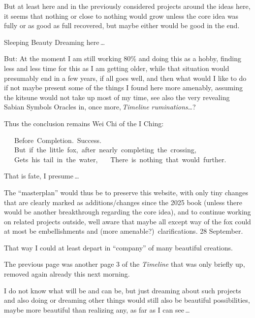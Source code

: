 {\begin{itemize}
But at least here and in the previously considered projects around the ideas here,
it seems that nothing or close to nothing would grow
unless the core idea was fully or as good as full recovered,
but maybe either would be good in the end.

Sleeping Beauty Dreaming here\,…

But: At the moment I am still working 80\% and doing this as a hobby,
finding less and less time for this as I am getting older,
while that situation would presumably end in a few years,
if all goes well,
and then what would I like to do
if not maybe present some of the things I found here more amenably,
assuming the kitsune would not take up most of my time,
see also the very revealing Sabian Symbols Oracles in, once more,\,\textsl{Timeline ruminations}…?

Thus the conclusion remains Wei Chi of the I Ching:

\vspace{1.2mm}
\mbox{\ \ \ Before Completion. Success.}\newline
\mbox{\ \ \ But if the little fox, after nearly completing the crossing,}\newline
\mbox{\ \ \ Gets his tail in the water,}\newline
\mbox{\ \ \ There is nothing that would further.}
\vspace{1.2mm}

That is fate, I presume\,…

The “masterplan” would thus be to preserve this website,
with only tiny changes that are clearly marked as additions/changes since the 2025 book
(unless there would be another breakthrough regarding the core idea),
and to continue working on related projects outside,
well aware that maybe all except way of the fox
could at most be embellishments and (more amenable?)\ clarifications.
%
28 September.

That way I could at least depart in “company” of many beautiful creations.

\end{itemize}
\normalsize

\newpage

\noindent
The previous page was another page 3 of the \textsl{Timeline}
that was only briefly up,
removed again already this next morning.

I do not know what will be and can be,
but just dreaming about such projects
and also doing or dreaming other things
would still also be beautiful possibilities,
maybe more beautiful than realizing any,
as far as I can see\,…

}
